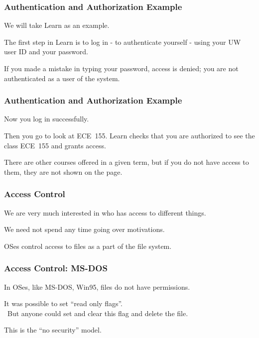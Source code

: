 \begin{frame}
\frametitle{Authentication and Authorization Example}
\begin{changemargin}{1cm}

We will take Learn as an example. 

The first step in Learn is to log in - to authenticate yourself - using your UW user ID and your password. 

If you made a mistake in typing your password, access is denied; you are not authenticated as a user of the system. 

\end{changemargin}
\end{frame}

\begin{frame}
\frametitle{Authentication and Authorization Example}
\begin{changemargin}{1cm}

Now you log in successfully.

Then you go to look at ECE~155. Learn checks that you are authorized to see the class ECE~155 and grants access. 

There are other courses offered in a given term, but if you do not have access to them, they are not shown on the page.

\end{changemargin}
\end{frame}

\begin{frame}
\frametitle{Access Control}
\begin{changemargin}{1cm}

We are very much interested in who has access to different things.

We need not spend any time going over motivations.

OSes control access to files as a part of the file system.

\end{changemargin}
\end{frame}

\begin{frame}
\frametitle{Access Control: MS-DOS}
\begin{changemargin}{1cm}

In OSes, like MS-DOS, Win95, files do not have permissions.

It was possible to set ``read only flags''.\\\
\quad But anyone could set and clear this flag and delete the file.

This is the ``no security'' model.

\end{changemargin}
\end{frame}

